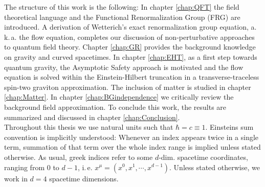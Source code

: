 The structure of this work is the following: In chapter \ref{chap:QFT} the field theoretical language and the Functional Renormalization Group (FRG) are introduced. A derivation of Wetterich's exact renormalization group equation, a.\,k.\,a. the flow equation,  completes our discussion of non-perturbative approaches to quantum field theory. Chapter \ref{chap:GR} provides the background knowledge on gravity and curved spacetimes. In chapter \ref{chap:EHT}, as a first step towards quantum gravity, the Asymptotic Safety approach is motivated and the flow equation is solved within the Einstein-Hilbert truncation in a transverse-traceless spin-two graviton approximation. The inclusion of matter is studied in chapter \ref{chap:Matter}. In chapter \ref{chap:BGindependence} we critically review the background field approximation.
To conclude this work, the results are summarized and discussed in chapter \ref{chap:Conclusion}. \\
 Throughout this thesis we use natural units such that $\hbar = c  \equiv 1$. Einsteins sum convention is implicitly understood: Whenever an index appears twice in a single term, summation of that term over the whole index range is implied unless stated otherwise. As usual, greek indices refer to some $d$-dim. spacetime coordinates, ranging from $0$ to $d-1$, i.\,e. $x^{\mu} = (x^0, x^1, \cdots, x^{d-1})$. Unless stated otherwise, we work in $d=4$ spacetime dimensions.

